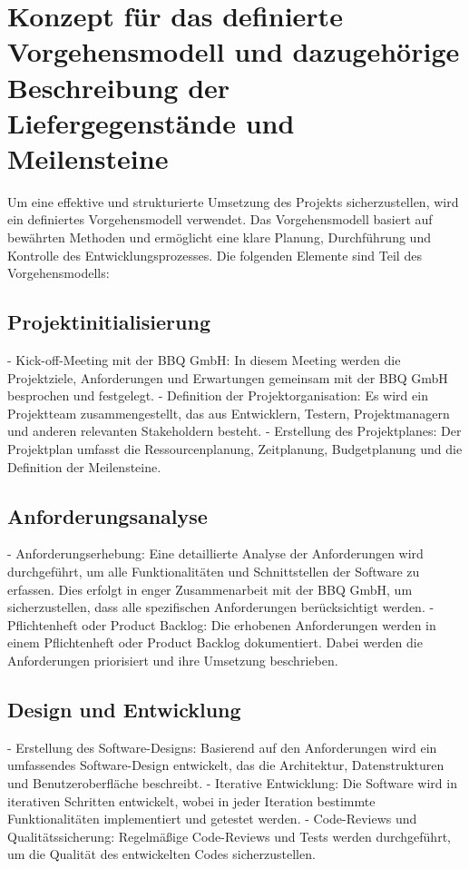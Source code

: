 \documentclass[12pt]{article}
\begin{document}
	
	\tableofcontents
	\newpage
	\thispagestyle{plain}
	
	
	\section{Konzept für das definierte Vorgehensmodell und dazugehörige Beschreibung der Liefergegenstände und Meilensteine}
	
	Um eine effektive und strukturierte Umsetzung des Projekts sicherzustellen, wird ein definiertes Vorgehensmodell verwendet. Das Vorgehensmodell basiert auf bewährten Methoden und ermöglicht eine klare Planung, Durchführung und Kontrolle des Entwicklungsprozesses. Die folgenden Elemente sind Teil des Vorgehensmodells:
	
	\subsection{Projektinitialisierung}
	- Kick-off-Meeting mit der BBQ GmbH: In diesem Meeting werden die Projektziele, Anforderungen und Erwartungen gemeinsam mit der BBQ GmbH besprochen und festgelegt.
	- Definition der Projektorganisation: Es wird ein Projektteam zusammengestellt, das aus Entwicklern, Testern, Projektmanagern und anderen relevanten Stakeholdern besteht.
	- Erstellung des Projektplanes: Der Projektplan umfasst die Ressourcenplanung, Zeitplanung, Budgetplanung und die Definition der Meilensteine.
	
	\subsection{Anforderungsanalyse}
	- Anforderungserhebung: Eine detaillierte Analyse der Anforderungen wird durchgeführt, um alle Funktionalitäten und Schnittstellen der Software zu erfassen. Dies erfolgt in enger Zusammenarbeit mit der BBQ GmbH, um sicherzustellen, dass alle spezifischen Anforderungen berücksichtigt werden.
	- Pflichtenheft oder Product Backlog: Die erhobenen Anforderungen werden in einem Pflichtenheft oder Product Backlog dokumentiert. Dabei werden die Anforderungen priorisiert und ihre Umsetzung beschrieben.
	
	\subsection{Design und Entwicklung}
	- Erstellung des Software-Designs: Basierend auf den Anforderungen wird ein umfassendes Software-Design entwickelt, das die Architektur, Datenstrukturen und Benutzeroberfläche beschreibt.
	- Iterative Entwicklung: Die Software wird in iterativen Schritten entwickelt, wobei in jeder Iteration bestimmte Funktionalitäten implementiert und getestet werden.
	- Code-Reviews und Qualitätssicherung: Regelmäßige Code-Reviews und Tests werden durchgeführt, um die Qualität des entwickelten Codes sicherzustellen.
	
\end{document}
